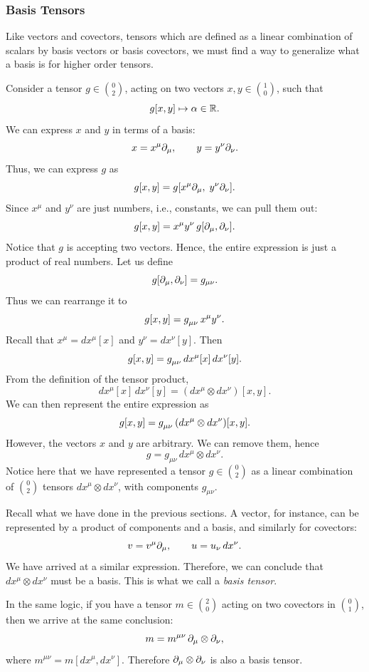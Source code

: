 \subsubsection{Basis Tensors}
	Like vectors and covectors, tensors which are defined as a linear combination of 
	scalars by basis vectors or basis covectors, we must find a way
	to generalize what a basis is for higher order tensors.

	Consider a tensor $g \in \binom{0}{2}$, acting on two vectors
	$x, y \in \binom{1}{0}$, such that
	\[
		g[x, y] \mapsto \alpha \in \mathbb{R}.
	\]
	We can express $x$ and $y$ in terms of a basis:
	\[
		x = x^\mu \partial_\mu,
		\qquad
		y = y^\nu \partial_\nu.
	\]
	Thus, we can express $g$ as
	\[
		g[x, y]
		= g\bqty{x^\mu \p_\mu,\; y^\nu \p_\nu}.
	\]
	Since $x^\mu$ and $y^\nu$ are just numbers, i.e., constants, we
	can pull them out:
	\[
		g[x, y]
		= x^\mu y^\nu\, g[\partial_\mu, \partial_\nu].
	\]
	Notice that $g$ is accepting two vectors. Hence, the entire
	expression is just a product of real numbers. Let us define
	\[
		g[\partial_\mu, \partial_\nu] = g_{\mu\nu}.
	\]
	Thus we can rearrange it to
	\[
		g[x, y]
		= \tensor{g}{_{\mu\nu}}\, x^\mu y^\nu.
	\]
	Recall that $x^\mu = dx^\mu[x]$ and $y^\nu = dx^\nu[y]$. Then
	\[
		g[x, y]
		= \tensor{g}{_{\mu\nu}}\,
		  dx^\mu[x]\, dx^\nu[y].
	\]
	From the definition of the tensor product,
	\[
		dx^\mu[x]\, dx^\nu[y]
		= (dx^\mu \otimes dx^\nu)[x, y].
	\]
	We can then represent the entire expression as
	\[
		g[x, y]
		= \tensor{g}{_{\mu\nu}}\,
		  (dx^\mu \otimes dx^\nu)[x, y].
	\]
	However, the vectors $x$ and $y$ are arbitrary. We can remove
	them, hence
	\[
		g = g_{\mu\nu}\, dx^\mu \otimes dx^\nu.
	\]
	Notice here that we have represented a tensor
	$g \in \binom{0}{2}$ as a linear combination of
	$\binom{0}{2}$ tensors $dx^\mu \otimes dx^\nu$, with
	components $g_{\mu\nu}$.

	Recall what we have done in the previous sections. A vector, for
	instance, can be represented by a product of components and a
	basis, and similarly for covectors:
	\[
		v = v^\mu \partial_\mu,
		\qquad
		u = u_\nu\, dx^\nu.
	\]
	We have arrived at a similar expression. Therefore, we can
	conclude that $dx^\mu \otimes dx^\nu$ must be a basis. This is
	what we call a \textit{basis tensor}.

	In the same logic, if you have a tensor $m \in \binom{2}{0}$
	acting on two covectors in $\binom{0}{1}$, then we arrive at the
	same conclusion:
	\[
		m = m^{\mu\nu}\, \partial_\mu \otimes \partial_\nu,
	\]
	where $m^{\mu\nu} = m[dx^\mu, dx^\nu]$. Therefore
	$\partial_\mu \otimes \partial_\nu$ is also a basis tensor.

